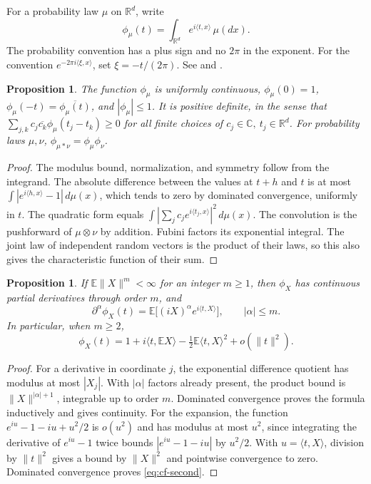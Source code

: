 \documentclass[11pt,oneside,openany]{book}
\newcommand{\E}{\mathbb{E}}
\newcommand{\R}{\mathbb{R}}
\newcommand{\C}{\mathbb{C}}
\theoremstyle{plain}
\newtheorem{proposition}[theorem]{Proposition}
\theoremstyle{definition}
\theoremstyle{remark}
\begin{document}
For a probability law \(\mu\) on \(\R^d\), write
\[
 \phi_\mu(t)=\int_{\R^d} e^{i\langle t,x\rangle}\,\mu(dx).
\]
The probability convention has a plus sign and no \(2\pi\) in the exponent.
For the convention \(e^{-2\pi i\langle \xi,x\rangle}\), set
\(\xi=-t/(2\pi)\). See \cite[Section 3.3]{Durrett} and
\cite[Lemmas 6.1 and 6.9]{Kallenberg}.

\begin{proposition}\label{prop:cf-basic}
The function \(\phi_\mu\) is uniformly continuous, \(\phi_\mu(0)=1\),
\(\phi_\mu(-t)=\overline{\phi_\mu(t)}\), and \(|\phi_\mu|\le 1\).
It is positive definite, in the sense that
\(\sum_{j,k}c_j\overline{c_k}\phi_\mu(t_j-t_k)\ge 0\)
for all finite choices of \(c_j\in\C,\ t_j\in\R^d\).
For probability laws \(\mu,\nu\),
\(\phi_{\mu*\nu}=\phi_\mu\phi_\nu\).
\end{proposition}

\begin{proof}
The modulus bound, normalization, and symmetry follow from the integrand.
The absolute difference between the values at \(t+h\) and \(t\) is at most
\(\int |e^{i\langle h,x\rangle}-1|\,d\mu(x)\), which tends to zero by
dominated convergence, uniformly in \(t\). The quadratic form equals
\(\int|\sum_j c_j e^{i\langle t_j,x\rangle}|^2\,d\mu(x)\).
The convolution is the pushforward of \(\mu\otimes\nu\) by addition.
Fubini factors its exponential integral. The joint law of independent
random vectors is the product of their laws, so this also gives the
characteristic function of their sum.
\end{proof}

\begin{proposition}\label{prop:cf-moment}
If \(\E\|X\|^m<\infty\) for an integer \(m\ge 1\), then \(\phi_X\)
has continuous partial derivatives through order \(m\), and
\[
 \partial^\alpha\phi_X(t)
   =\E\big[(iX)^\alpha e^{i\langle t,X\rangle}\big],
 \qquad |\alpha|\le m .
\]
In particular, when \(m\ge2\),
\begin{equation}\label{eq:cf-second}
 \phi_X(t)=1+i\langle t,\E X\rangle
     -\tfrac12\E\langle t,X\rangle^2+o(\|t\|^2).
\end{equation}
\end{proposition}

\begin{proof}
For a derivative in coordinate \(j\), the exponential difference quotient
has modulus at most \(|X_j|\). With \(|\alpha|\) factors already present,
the product bound is \(\|X\|^{|\alpha|+1}\), integrable up to order \(m\).
Dominated convergence proves the formula inductively and gives continuity.
For the expansion, the function
\(e^{iu}-1-iu+u^2/2\) is \(o(u^2)\) and has modulus at most \(u^2\),
since integrating the derivative of \(e^{iu}-1\) twice bounds
\(|e^{iu}-1-iu|\) by \(u^2/2\). With \(u=\langle t,X\rangle\), division
by \(\|t\|^2\) gives a bound by \(\|X\|^2\) and pointwise convergence
to zero. Dominated convergence proves \eqref{eq:cf-second}.
\end{proof}
\end{document}
